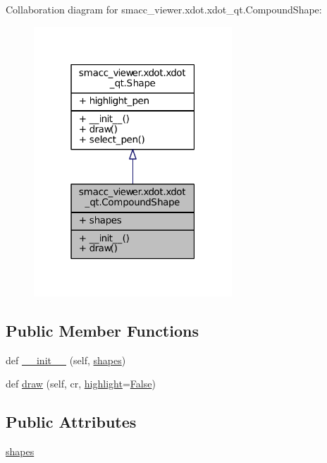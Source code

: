 Collaboration diagram for smacc\+\_\+viewer.\+xdot.\+xdot\+\_\+qt.\+Compound\+Shape\+:
\nopagebreak
\begin{figure}[H]
\begin{center}
\leavevmode
\includegraphics[width=211pt]{classsmacc__viewer_1_1xdot_1_1xdot__qt_1_1CompoundShape__coll__graph}
\end{center}
\end{figure}
\subsection*{Public Member Functions}
\begin{DoxyCompactItemize}
\item 
def \hyperlink{classsmacc__viewer_1_1xdot_1_1xdot__qt_1_1CompoundShape_a8ef7110249ad5cb60739b6e11f8bc2f4}{\+\_\+\+\_\+init\+\_\+\+\_\+} (self, \hyperlink{classsmacc__viewer_1_1xdot_1_1xdot__qt_1_1CompoundShape_ad2f848b99323a9a844ffa4769737f69e}{shapes})
\item 
def \hyperlink{classsmacc__viewer_1_1xdot_1_1xdot__qt_1_1CompoundShape_a28d297209df3c2ee3061f9407a33eaa8}{draw} (self, cr, \hyperlink{namespacesmacc__viewer_1_1xdot_1_1xdot__qt_ab7970f10809cac5c23ebf9c6badb6d79}{highlight}=\hyperlink{namespacesmacc__viewer_a5928e8da279785cbab9011356c3eaa87}{False})
\end{DoxyCompactItemize}
\subsection*{Public Attributes}
\begin{DoxyCompactItemize}
\item 
\hyperlink{classsmacc__viewer_1_1xdot_1_1xdot__qt_1_1CompoundShape_ad2f848b99323a9a844ffa4769737f69e}{shapes}
\end{DoxyCompactItemize}


